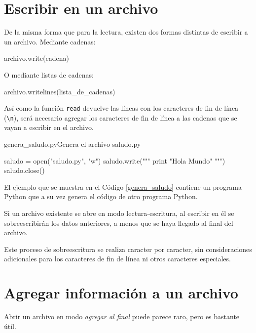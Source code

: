 \section{Escribir en un archivo}

De la misma forma que para la lectura, existen dos formas distintas de
escribir a un archivo.  Mediante cadenas:

\begin{codigo-python-sn}
archivo.write(cadena)
\end{codigo-python-sn}

O mediante listas de cadenas:

\begin{codigo-python-sn}
archivo.writelines(lista_de_cadenas)
\end{codigo-python-sn}

Así como la función \lstinline!read! devuelve las líneas con los caracteres
de fin de línea (\lstinline!\n!), será necesario agregar los caracteres de
fin de línea a las cadenas que se vayan a escribir en el archivo.

\begin{codigo}{genera\_saludo.py}{Genera el archivo saludo.py}
\label{genera_saludo}
\begin{codigo-python}
saludo = open("saludo.py", "w")
saludo.write("""
print "Hola Mundo"
""")
saludo.close()
\end{codigo-python}
\end{codigo}

El ejemplo que se muestra en el Código \ref{genera_saludo} contiene un
programa Python que a su vez genera el código de otro programa Python.

\begin{atencion}
Si un archivo existente se abre en modo lectura-escritura, al escribir en
él se sobreescribirán los datos anteriores, a menos que se haya llegado al
final del archivo.

Este proceso de sobreescritura se realiza caracter por caracter, sin
consideraciones adicionales para los caracteres de fin de línea ni otros
caracteres especiales.
\end{atencion}

\section{Agregar información a un archivo}

Abrir un archivo en modo {\it agregar al final} puede parece raro,
pero es bastante útil.

